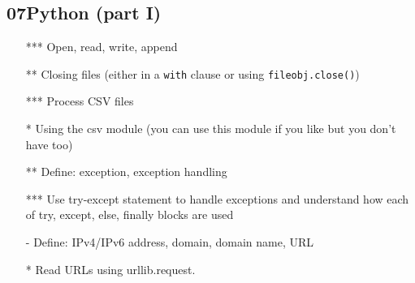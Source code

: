 \documentclass{article}%
\begin{document}
\subsection*{07Python (part I)}


\begin{itemize}
\item[***] Open, read, write, append
\item[**] Closing files (either in a {\tt with} clause or using {\tt fileobj.close()})
\item[***] Process CSV files
\item[*]   Using the csv module (you can use this module if you like but you don't have too)
\item[**] Define: exception, exception handling
\item[***] Use try-except statement to handle exceptions and understand how each of try, except, else, finally blocks are used
\item[-] Define: IPv4/IPv6 address, domain, domain name, URL
\item[*] Read URLs using urllib.request.
\end{itemize}



%
\end{document}
